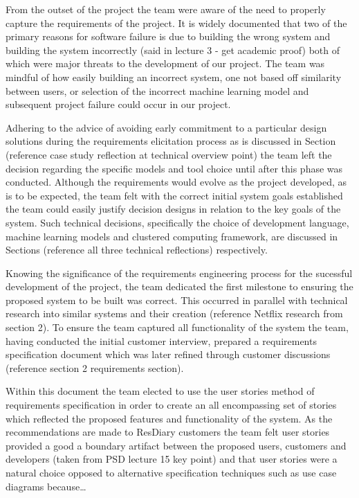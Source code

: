 \documentclass{l3proj}
\begin{document}


From the outset of the project the team were aware of the need to properly capture the requirements of the project. It is widely documented that two of the primary reasons for software failure is due to building the wrong system and building the system incorrectly (said in lecture 3 - get academic proof) both of which were major threats to the development of our project. The team was mindful of how easily building an incorrect system, one not based off similarity between users, or selection of the incorrect machine learning model and subsequent project failure could occur in our project. 

Adhering to the advice of avoiding early commitment to a particular design solutions during the requirements elicitation process as is discussed in Section (reference case study reflection at technical overview point) the team left the decision regarding the specific models and tool choice until after this phase was conducted. Although the requirements would evolve as the project developed, as is to be expected, the team felt with the correct initial system goals established the team could easily justify decision designs in relation to the key goals of the system. Such technical decisions, specifically the choice of development language, machine learning models and clustered computing framework, are discussed in Sections (reference all three technical reflections) respectively. 

Knowing the significance of the requirements engineering process for the sucessful development of the project, the team dedicated the first milestone to ensuring the proposed system to be built was correct. This occurred in parallel with technical research into similar systems and their creation (reference Netflix research from section 2). To ensure the team captured all functionality of the system the team, having conducted the initial customer interview, prepared a requirements specification document which was later refined through customer discussions (reference section 2 requirements section). 

Within this document the team elected to use the user stories method of requirements specification in order to create an all encompassing set of stories which reflected the proposed features and functionality of the system. As the recommendations are made to ResDiary customers the team felt user stories provided a good a boundary artifact between the proposed users, customers and developers (taken from PSD lecture 15 key point) and that user stories were a natural choice opposed to alternative specification techniques such as use case diagrams because… 
\end{document}
